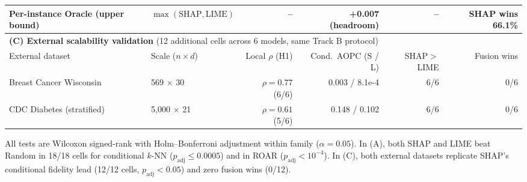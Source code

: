 \begin{table}[t]
{\begin{tabular}{llrrrr}
\quad Per-instance Oracle (upper bound) & $\max(\text{SHAP},\text{LIME})$ & -- & +0.007 (headroom) & -- & SHAP wins 66.1\% \\
\midrule
\multicolumn{6}{l}{\textbf{(C) External scalability validation} (12 additional cells across 6 models, same Track B protocol)} \\
\cmidrule(lr){1-6}
External dataset & Scale ($n \times d$) & Local $\rho$ (H1) & Cond.\ AOPC (S / L) & SHAP$>$LIME & Fusion wins \\
\midrule
\quad Breast Cancer Wisconsin & 569 $\times$ 30 & $\rho=0.77$ (6/6) & 0.003 / 8.1e-4 & 6/6 & 0/6 \\
\quad CDC Diabetes (stratified) & 5,000 $\times$ 21 & $\rho=0.61$ (5/6) & 0.148 / 0.102 & 6/6 & 0/6 \\
\bottomrule
\end{tabular}
}
\par\vspace{2pt}\footnotesize All tests are Wilcoxon signed-rank with Holm--Bonferroni adjustment within family ($\alpha=0.05$). In (A), both SHAP and LIME beat Random in 18/18 cells for conditional $k$-NN ($p_{\text{adj}} \le 0.0005$) and in ROAR ($p_{\text{adj}} < 10^{-4}$). In (C), both external datasets replicate SHAP's conditional fidelity lead (12/12 cells, $p_{\text{adj}} < 0.05$) and zero fusion wins (0/12).
\end{table}
